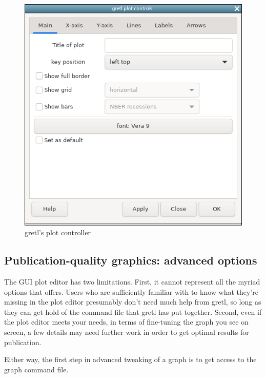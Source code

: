 \begin{figure}[htbp]
  \begin{center}
    \includegraphics[scale=0.6]{figures/plot_control}
  \end{center}
  \caption{gretl's plot controller}
  \label{fig-plot}
\end{figure}


\subsection{Publication-quality graphics: advanced options}
\label{plot-advanced}

The GUI plot editor has two limitations.  First, it cannot represent
all the myriad options that  offers. Users who are
sufficiently familiar with  to know what they're missing
in the plot editor presumably don't need much help from gretl,
so long as they can get hold of the  command file that
gretl has put together.  Second, even if the plot editor meets
your needs, in terms of fine-tuning the graph you see on screen, a few
details may need further work in order to get optimal results for
publication.

Either way, the first step in advanced tweaking of a graph is to get
access to the graph command file.

